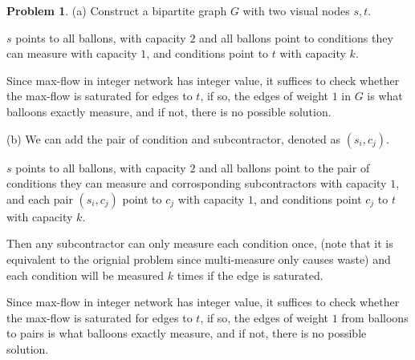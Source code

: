 \documentclass[a4paper]{article}
\theoremstyle{definition}
\newtheorem{problem}{Problem}
\theoremstyle{plain}
\numberwithin{equation}{problem}
\begin{document}
\begin{problem}
    (a) Construct a bipartite graph  $ G $ with two visual nodes $ s,t $.
    
    $ s $ points to all ballons, with capacity  $ 2 $ and all ballons point to conditions they can measure with capacity  $ 1 $, and conditions point to  $ t $ with capacity  $ k $.
     
    Since max-flow in integer network has integer value, it suffices to check whether the max-flow is saturated for edges to  $ t $, if so, the edges of weight  $ 1 $ in  $ G $ is what balloons exactly measure, and if not, there is no possible solution.   



    (b) We can add the pair of condition and subcontractor, denoted as  $ (s_i,c_j) $.
    
    $ s $ points to all ballons, with capacity  $ 2 $ and all ballons point to the pair of conditions they can measure and corrosponding subcontractors with capacity  $ 1 $, and each pair $ (s_i,c_j) $  point to  $ c_j $ with capacity  $ 1 $, and conditions point $ c_j $  to  $ t $ with capacity  $ k $.

    Then any subcontractor can only measure each condition once, (note that it is equivalent to the orignial problem since multi-measure only causes waste) and each condition will be measured  $ k $ times if the edge is saturated.

    Since max-flow in integer network has integer value, it suffices to check whether the max-flow is saturated for edges to  $ t $, if so, the edges of weight  $ 1 $ from balloons to pairs is what balloons exactly measure, and if not, there is no possible solution.   
\end{problem}
\end{document}
